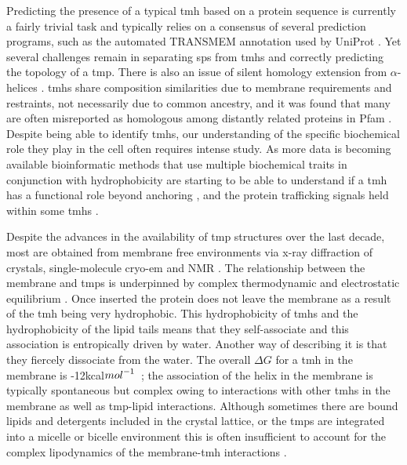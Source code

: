 Predicting the presence of a typical \gls{tmh} based on a protein sequence is currently a fairly trivial task and typically relies on a consensus of several prediction programs, such as the automated TRANSMEM annotation used by UniProt \cite{TheUniProtConsortium2014}.
Yet several challenges remain in separating \gls{sp}s from \gls{tmh}s \cite{Petersen2011} and correctly predicting the topology of a \gls{tmp}.
There is also an issue of silent homology extension from $\alpha$\--helices \cite{Wong2010}.
\gls{tmh}s share composition similarities due to membrane requirements and restraints, not necessarily due to common ancestry, and it was found that many are often misreported as homologous among distantly related proteins in Pfam \cite{Wong2010}.
Despite being able to identify \gls{tmh}s, our understanding of the specific biochemical role they play in the cell often requires intense study.
As more data is becoming available bioinformatic methods that use multiple biochemical traits in conjunction with hydrophobicity are starting to be able to understand if a \gls{tmh} has a functional role beyond anchoring \cite{Wong2011, Wong2012}, and the protein trafficking signals held within some \gls{tmh}s \cite{Guna2018}.

Despite the advances in the availability of \gls{tmp} structures over the last decade, most are obtained from membrane free environments via x\--ray diffraction of crystals, single\--molecule cryo\--\gls{em} and NMR \cite{Vinothkumar2015, Stansfeld2015}.
The relationship between the membrane and \gls{tmp}s is underpinned by complex thermodynamic and  electrostatic equilibrium \cite{Cymer2015}.
Once inserted the protein does not leave the membrane as a result of the \gls{tmh} being very hydrophobic.
This hydrophobicity of \gls{tmh}s and the hydrophobicity of the lipid tails means that they self\--associate and this association is entropically driven by water.
Another way of describing it is that they fiercely dissociate from the water.
The overall $\Delta G$ for a \gls{tmh} in the membrane is -12kcal${mol}^{\--1}$~\cite{Cymer2015}; the association of the helix in the membrane is typically spontaneous but complex owing to interactions with other \gls{tmh}s in the membrane as well as \gls{tmp}\--lipid interactions.
Although sometimes there are bound lipids and detergents included in the crystal lattice, or the \gls{tmp}s are integrated into a micelle or bicelle environment this is often insufficient to account for the complex lipodynamics of the membrane\--\gls{tmh} interactions \cite{Coskun2011, Stansfeld2015}.

